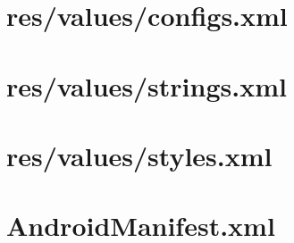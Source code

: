 \documentclass[11pt]{jreport}
\renewcommand{\slash}{/}
\begin{document}
    \section{res\slash values\slash configs.xml}
    

    \section{res\slash values\slash strings.xml}
    

    \section{res\slash values\slash styles.xml}
    

    \section{AndroidManifest.xml}
    
\end{document}
